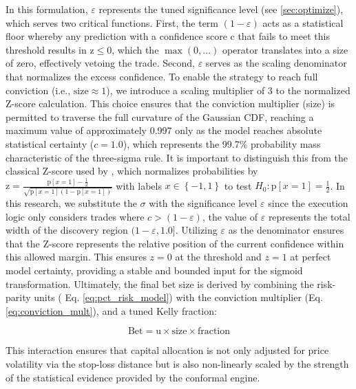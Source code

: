 \documentclass[12pt, a4paper]{article}
\begin{document}
In this formulation, \( \varepsilon \) represents the tuned significance level (see \ref{sec:optimize}), which serves two critical functions. 
First, the term \( (1 - \varepsilon) \) acts as a statistical floor whereby any prediction with a confidence score c that fails to meet this threshold results in 
\( \text{z} \leq 0 \), which the \( \max\left(0, ...\right) \) operator translates into a size of zero, effectively vetoing the trade. 
Second, \( \varepsilon \) serves as the scaling denominator that normalizes the excess confidence. 
To enable the strategy to reach full conviction (i.e., \( \text{size} \approx 1 \)), we introduce a scaling multiplier of 3 to the normalized Z-score calculation. 
This choice ensures that the conviction multiplier (size) is permitted to traverse the full curvature of the Gaussian CDF, reaching a maximum value of approximately 0.997 
only as the model reaches absolute statistical certainty (\( c = 1.0 \)), which represents the 99.7\% probability mass characteristic of the three-sigma rule.
It is important to distinguish this from the classical Z-score used by \textcite[143]{lopez_de_prado_advances_2018}, which normalizes probabilities by 
\( \text{z} = \frac{\text{p}\left[x=1\right] - \frac{1}{2}}{\sqrt{\text{p}\left[x=1\right] \left(1 - \text{p}\left[x=1\right]\right)}} \) with labels \( x \in \left\{-1,1\right\} \) to test 
\( H_0 : \text{p}\left[x=1\right] = \frac{1}{2} \). In this research, we substitute the \( \sigma \) with the significance level \( \varepsilon \) since the execution logic only 
considers trades where \( c > (1 - \varepsilon) \), the value of \( \varepsilon \) represents the total width of the discovery region \( (1-\varepsilon, 1.0] \). 
Utilizing \( \varepsilon \) as the denominator ensures that the Z-score represents the relative position of the current confidence within this allowed margin. 
This ensures $z=0$ at the threshold and $z=1$ at perfect model certainty, providing a stable and bounded input for the sigmoid transformation.
Ultimately, the final bet size is derived by combining the risk-parity units ( Eq. \ref{eq:pct_risk_model}) with the conviction multiplier (Eq. \ref{eq:conviction_mult}), and 
a tuned Kelly fraction:

\begin{equation}
    \text{Bet} = \text{u} \times \text{size} \times \text{fraction}
    \label{eq:bet}
\end{equation}

This interaction ensures that capital allocation is not only adjusted for price volatility via the stop-loss distance but is also non-linearly scaled by the strength of the 
statistical evidence provided by the conformal engine.
\end{document}
